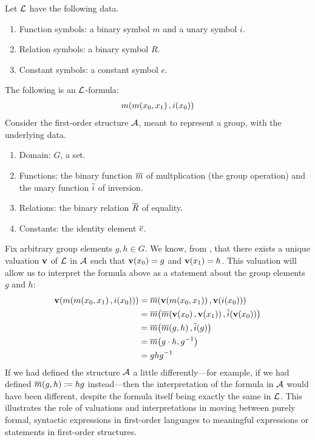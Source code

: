 \begin{boxexample}
    Let $\mathcal{L}$ have the following data.
    \begin{enumerate}
        \item Function symbols: a binary symbol $m$ and a unary symbol $i$.
        \item Relation symbols: a binary symbol $R$.
        \item Constant symbols: a constant symbol $e$.
    \end{enumerate}
    The following is an $\mathcal{L}$-formula:
    \begin{align*}
        m\!\left( m\!\left( x_0, x_1 \right), i\!\left( x_0 \right) \right)
    \end{align*}
    Consider the first-order structure $\mathcal{A}$, meant to represent a group, with the underlying data.
    \begin{enumerate}
        \item Domain: $G$, a set.
        \item Functions: the binary function $\overline{m}$ of multplication (the group operation) and the unary function $\overline{i}$ of inversion.
        \item Relations: the binary relation $\overline{R}$ of equality.
        \item Constants: the identity element $\overline{e}$.
    \end{enumerate}
    Fix arbitrary group elements $g, h \in G$. We know, from , that there exists a unique valuation $\mathbf{v}$ of $\mathcal{L}$ in $\mathcal{A}$ such that $\mathbf{v}\!\left( x_0 \right) = g$ and $\mathbf{v}\!\left( x_1 \right) = h$. This valuation will allow us to interpret the formula above as a statement about the group elements $g$ and $h$:
    \begin{align*}
        \vof{m\of{m\of{x_0, x_1}, i\of{x_0}}}
        &= \ol{m}\of{\vof{m\of{x_0, x_1}}, \vof{i\of{x_0}}} \\
        &= \ol{m}\of{\ol{m}\of{\vof{x_0}, \vof{x_1}}, \ol{i}\of{\vof{x_0}}} \\
        &= \ol{m}\of{\ol{m}\of{g, h}, \ol{i}\of{g}} \\
        &= \ol{m}\of{g \cdot h, g\inv} \\
        &= ghg\inv
    \end{align*}
    If we had defined the structure $\mathcal{A}$ a little differently---for example, if we had defined $\overline{m}\!\left( g, h \right) := hg$ instead---then the interpretation of the formula in $\mathcal{A}$ would have been different, despite the formula itself being exactly the same in $\mathcal{L}$. This illustrates the role of valuations and interpretations in moving between purely formal, syntactic expressions in first-order languages to meaningful expressions or statements in first-order structures.
\end{boxexample}

